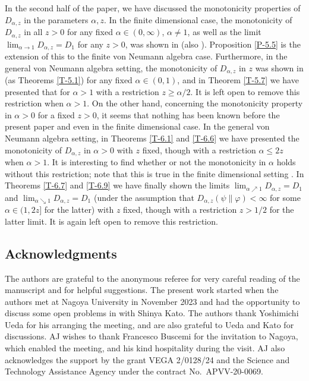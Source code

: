 \documentclass[12pt]{article}
\theoremstyle{definition}
\theoremstyle{remark}
\numberwithin{equation}{section}
\def\ffi{\varphi}
\begin{document}
In the second half of the paper, we have discussed the monotonicity properties of $D_{\alpha,z}$ in the
parameters $\alpha,z$. In the finite dimensional case, the monotonicity of $D_{\alpha,z}$ in all $z>0$ for
any fixed $\alpha\in(0,\infty)$, $\alpha\ne1$, as well as the limit $\lim_{\alpha\to1}D_{\alpha,z}=D_1$ for
any $z>0$, was shown in \cite{lin2015investigating} (also \cite{mosonyi2023somecontinuity}).
Proposition \ref{P-5.5} is the extension of this to the finite von Neumann algebra case. Furthermore,
in the general von Neumann algebra setting, the monotonicity of $D_{\alpha,z}$ in $z$ was shown in
\cite{kato2023onrenyi} (as Theorems \ref{T-5.1}) for any fixed $\alpha\in(0,1)$, and in Theorem \ref{T-5.7}
we have presented that for $\alpha>1$ with a restriction $z\ge\alpha/2$. It is left open to remove this
restriction when $\alpha>1$. On the other hand, concerning the monotonicity property in $\alpha>0$ for
a fixed $z>0$, it seems that nothing has been known before the present paper and
\cite{hiai2024log-majorization} even in the finite dimensional case. In the general von Neumann algebra
setting, in Theorems \ref{T-6.1} and \ref{T-6.6} we have presented the monotonicity of $D_{\alpha,z}$ in
$\alpha>0$ with $z$ fixed, though with a restriction $\alpha\le2z$ when $\alpha>1$. 
It is interesting to find whether or not the monotonicity in $\alpha$ holds without this restriction;
note that this is true in the finite dimensional setting \cite[Theorem
3.1(ii)]{hiai2024log-majorization}. In Theorems \ref{T-6.7} and
\ref{T-6.9} we have finally shown the limits $\lim_{\alpha\nearrow1}D_{\alpha,z}=D_1$ and
$\lim_{\alpha\searrow1}D_{\alpha,z}=D_1$ (under the assumption that $D_{\alpha,z}(\psi\|\ffi)<\infty$ for
some $\alpha\in(1,2z]$ for the latter) with $z$ fixed, though with a restriction $z>1/2$ for the latter limit.
It is again left open to remove this restriction.


\subsection*{Acknowledgments}

{\color{red}The authors are grateful to the anonymous referee for very careful reading of the manuscript and
for helpful suggestions.} The present work started when the authors met at Nagoya University in
November 2023 and had the opportunity to discuss some open problems in \cite{kato2023onrenyi} with
Shinya Kato. The authors thank Yoshimichi Ueda for his arranging the meeting, and are also grateful to
Ueda and Kato for discussions. AJ wishes to thank Francesco Buscemi for the invitation to Nagoya,
which enabled the meeting, and his kind hospitality during the visit. AJ also acknowledges the support by
the grant VEGA 2/0128/24 and the  Science and Technology Assistance Agency under the
contract No.\ APVV-20-0069.
\end{document}
